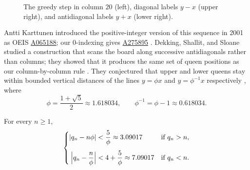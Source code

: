 \begin{figure}[!ht]
{\begin{minipage}{0.84\linewidth}
\begin{minipage}[t]{0.40\linewidth}
\end{minipage}
\end{minipage}%
}
\caption{The greedy step in column $20$ (left), diagonal labels $y-x$
(upper right), and antidiagonal labels $y+x$ (lower right).}
\label{fig:infinite-board}
\end{figure}

Antti Karttunen introduced the positive-integer version of this sequence
in 2001 as OEIS \href{https://oeis.org/A065188}{A065188}; our $0$-indexing gives
\href{https://oeis.org/A275895}{A275895} \cite{OEIS}.
Dekking, Shallit, and Sloane studied a construction that scans the
board along successive antidiagonals rather than columns; they showed that it produces the same set of
queen positions as our column-by-column rule \cite[pp.~24--25]{DSS}.
They conjectured that upper and lower queens stay within bounded
vertical distances of the lines $y=\phi x$ and $y=\phi^{-1}x$ respectively
\cite[Conjecture~25]{DSS}, where
\[
 \phi=\frac{1+\sqrt5}{2}\approx1.618034,\qquad \phi^{-1}=\phi-1\approx0.618034.
\]

\begin{theorem}\label{thm:main}
For every $n\ge1$,
\[
 \left\{
 \begin{aligned}
 \left|q_n-n\phi\right|&<\frac{5}{\phi}\approx3.09017&&\text{if }q_n>n,\\[4pt]
 \Bigl|q_n-\frac{n}{\phi}\Bigr|&<4+\frac{5}{\phi}\approx7.09017&&\text{if }q_n<n.
 \end{aligned}
 \right.
\]
\end{theorem}

